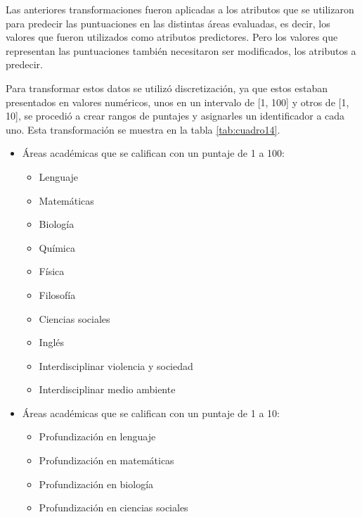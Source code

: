 Las anteriores transformaciones fueron aplicadas a los atributos que se utilizaron para predecir las puntuaciones en las distintas áreas evaluadas, es decir, los valores que fueron utilizados como atributos predictores. Pero los valores que representan las puntuaciones también necesitaron ser modificados, los atributos a predecir.

Para transformar estos datos se utilizó discretización, ya que estos estaban presentados en valores numéricos, unos en un intervalo de [1, 100] y otros de [1, 10], se procedió a crear rangos de puntajes y asignarles un identificador a cada uno. Esta transformación se muestra en la tabla \ref{tab:cuadro14}.
\begin{itemize}
\item Áreas académicas que se califican con un puntaje de 1 a 100:
\begin{itemize}
\item Lenguaje 
\item Matemáticas 
\item Biología 
\item Química 
\item Física 
\item Filosofía 
\item Ciencias sociales 
\item Inglés  
\item Interdisciplinar violencia y sociedad 
\item Interdisciplinar medio ambiente
\end{itemize}
\item Áreas académicas que se califican con un puntaje de 1 a 10:
\begin{itemize}
\item Profundización en lenguaje 
\item Profundización en matemáticas 
\item Profundización en biología 
\item Profundización en ciencias sociales
\end{itemize}
\end{itemize}

